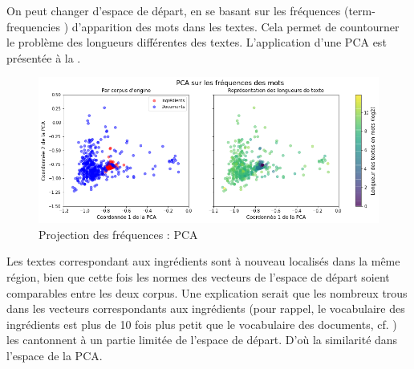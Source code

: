             On peut changer d'espace de départ, en se basant sur les fréquences (\og term-frequencies \fg) d'apparition des mots dans les textes. 
            Cela permet de countourner le problème des longueurs différentes des textes.
            L'application d'une PCA est présentée à la .
            \begin{figure}[htbp]
                \begin{center}
                \includegraphics[width=0.9\linewidth]{img/PCA_freq.png}
                \end{center}
                \caption{Projection des fréquences : PCA}
                \label{fig:PCA_freq}
            \end{figure}
            Les textes correspondant aux ingrédients sont à nouveau localisés dans la même région, bien que cette fois les normes des vecteurs de l'espace de départ soient comparables entre les deux corpus.
            Une explication serait que les nombreux \og trous \fg dans les vecteurs correspondants aux ingrédients (pour rappel, le vocabulaire des ingrédients est plus de 10 fois plus petit que le vocabulaire des documents, cf. ) les cantonnent à un partie limitée de l'espace de départ.
            D'où la similarité dans l'espace de la PCA.


